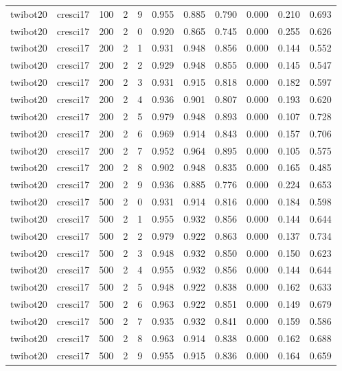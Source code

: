 \begin{tabular}{llrrrrrrrrr}
twibot20 & cresci17 & 100 & 2 & 9 & 0.955 & 0.885 & 0.790 & 0.000 & 0.210 & 0.693 \\
twibot20 & cresci17 & 200 & 2 & 0 & 0.920 & 0.865 & 0.745 & 0.000 & 0.255 & 0.626 \\
twibot20 & cresci17 & 200 & 2 & 1 & 0.931 & 0.948 & 0.856 & 0.000 & 0.144 & 0.552 \\
twibot20 & cresci17 & 200 & 2 & 2 & 0.929 & 0.948 & 0.855 & 0.000 & 0.145 & 0.547 \\
twibot20 & cresci17 & 200 & 2 & 3 & 0.931 & 0.915 & 0.818 & 0.000 & 0.182 & 0.597 \\
twibot20 & cresci17 & 200 & 2 & 4 & 0.936 & 0.901 & 0.807 & 0.000 & 0.193 & 0.620 \\
twibot20 & cresci17 & 200 & 2 & 5 & 0.979 & 0.948 & 0.893 & 0.000 & 0.107 & 0.728 \\
twibot20 & cresci17 & 200 & 2 & 6 & 0.969 & 0.914 & 0.843 & 0.000 & 0.157 & 0.706 \\
twibot20 & cresci17 & 200 & 2 & 7 & 0.952 & 0.964 & 0.895 & 0.000 & 0.105 & 0.575 \\
twibot20 & cresci17 & 200 & 2 & 8 & 0.902 & 0.948 & 0.835 & 0.000 & 0.165 & 0.485 \\
twibot20 & cresci17 & 200 & 2 & 9 & 0.936 & 0.885 & 0.776 & 0.000 & 0.224 & 0.653 \\
twibot20 & cresci17 & 500 & 2 & 0 & 0.931 & 0.914 & 0.816 & 0.000 & 0.184 & 0.598 \\
twibot20 & cresci17 & 500 & 2 & 1 & 0.955 & 0.932 & 0.856 & 0.000 & 0.144 & 0.644 \\
twibot20 & cresci17 & 500 & 2 & 2 & 0.979 & 0.922 & 0.863 & 0.000 & 0.137 & 0.734 \\
twibot20 & cresci17 & 500 & 2 & 3 & 0.948 & 0.932 & 0.850 & 0.000 & 0.150 & 0.623 \\
twibot20 & cresci17 & 500 & 2 & 4 & 0.955 & 0.932 & 0.856 & 0.000 & 0.144 & 0.644 \\
twibot20 & cresci17 & 500 & 2 & 5 & 0.948 & 0.922 & 0.838 & 0.000 & 0.162 & 0.633 \\
twibot20 & cresci17 & 500 & 2 & 6 & 0.963 & 0.922 & 0.851 & 0.000 & 0.149 & 0.679 \\
twibot20 & cresci17 & 500 & 2 & 7 & 0.935 & 0.932 & 0.841 & 0.000 & 0.159 & 0.586 \\
twibot20 & cresci17 & 500 & 2 & 8 & 0.963 & 0.914 & 0.838 & 0.000 & 0.162 & 0.688 \\
twibot20 & cresci17 & 500 & 2 & 9 & 0.955 & 0.915 & 0.836 & 0.000 & 0.164 & 0.659 \\

\end{tabular}
